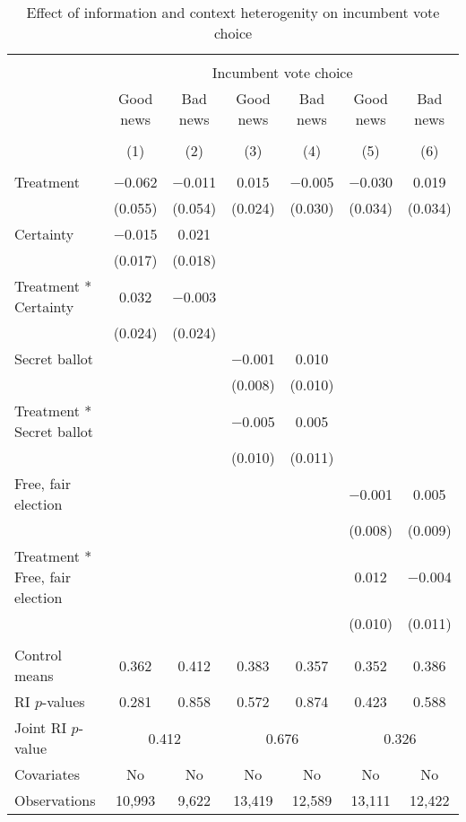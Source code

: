 
\begin{table}[!htbp] \centering 
  \caption{Effect of information and context heterogenity on incumbent vote choice} 
  \label{context_hetero} 
\begin{tabular}{@{\extracolsep{1pt}}lcccccc} 
\\[-1.8ex]\hline 
\hline \\[-1.8ex] 
 & \multicolumn{6}{c}{Incumbent vote choice} \\ 
\cline{2-7} 
 & Good news & Bad news & Good news & Bad news & Good news & Bad news \\ 
\cline{2-7}
\\[-1.8ex] & (1) & (2) & (3) & (4) & (5) & (6)\\ 
\hline \\[-1.8ex] 
 Treatment & $-$0.062 & $-$0.011 & 0.015 & $-$0.005 & $-$0.030 & 0.019 \\ 
  & (0.055) & (0.054) & (0.024) & (0.030) & (0.034) & (0.034) \\ 
  Certainty & $-$0.015 & 0.021 &  &  &  &  \\ 
  & (0.017) & (0.018) &  &  &  &  \\ 
  Treatment * Certainty & 0.032 & $-$0.003 &  &  &  &  \\ 
  & (0.024) & (0.024) &  &  &  &  \\ 
  Secret ballot &  &  & $-$0.001 & 0.010 &  &  \\ 
  &  &  & (0.008) & (0.010) &  &  \\ 
  Treatment * Secret ballot &  &  & $-$0.005 & 0.005 &  &  \\ 
  &  &  & (0.010) & (0.011) &  &  \\ 
  Free, fair election &  &  &  &  & $-$0.001 & 0.005 \\ 
  &  &  &  &  & (0.008) & (0.009) \\ 
  Treatment * Free, fair election &  &  &  &  & 0.012 & $-$0.004 \\ 
  &  &  &  &  & (0.010) & (0.011) \\ 
 \hline \\[-1.8ex] 
Control means & 0.362 & 0.412 & 0.383 & 0.357 & 0.352 & 0.386 \\ 
RI $p$-values & 0.281 & 0.858 & 0.572 & 0.874 & 0.423 & 0.588 \\ 
Joint RI $p$-value & \multicolumn{2}{c}{0.412} & \multicolumn{2}{c}{0.676} & \multicolumn{2}{c}{0.326}\\
Covariates & No & No & No & No & No & No \\ 
Observations & 10,993 & 9,622 & 13,419 & 12,589 & 13,111 & 12,422 \\ 

\end{tabular}
\end{table}
